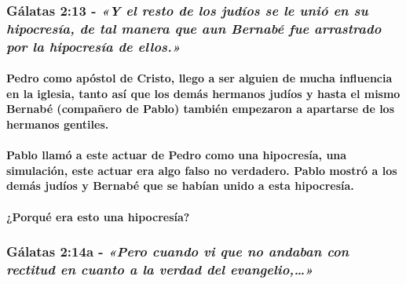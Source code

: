 \documentclass[11a pt,twoside]{article}
\newcommand{\scripture}[1]{%
  {\fontsize{12pt}{16pt}\selectfont\ScriptureFont\itshape #1}%
}
\let\oldsubsubsection\subsubsection
\renewcommand{\subsubsection}{\needspace{4\baselineskip}\oldsubsubsection}
\let\oldparagraph\paragraph
\renewcommand{\paragraph}{\needspace{3\baselineskip}\oldparagraph}
\begin{document}
\subsubsection{\texorpdfstring{Gálatas 2:13 -
\scripture{«Y el resto de los judíos se le unió en su hipocresía, de tal manera que aun Bernabé fue arrastrado por la hipocresía de ellos.»}}{Gálatas 2:13 - }}\label{guxe1latas-213---y-el-resto-de-los-juduxedos-se-le-uniuxf3-en-su-hipocresuxeda-de-tal-manera-que-aun-bernabuxe9-fue-arrastrado-por-la-hipocresuxeda-de-ellos.}

\paragraph{Pedro como apóstol de Cristo, llego a ser alguien de mucha
influencia en la iglesia, tanto así que los demás hermanos judíos y
hasta el mismo Bernabé (compañero de Pablo) también empezaron a
apartarse de los hermanos
gentiles.}\label{pedro-como-apuxf3stol-de-cristo-llego-a-ser-alguien-de-mucha-influencia-en-la-iglesia-tanto-asuxed-que-los-demuxe1s-hermanos-juduxedos-y-hasta-el-mismo-bernabuxe9-compauxf1ero-de-pablo-tambiuxe9n-empezaron-a-apartarse-de-los-hermanos-gentiles.}

\paragraph{Pablo llamó a este actuar de Pedro como una hipocresía, una
simulación, este actuar era algo falso no verdadero. Pablo mostró a los
demás judíos y Bernabé que se habían unido a esta
hipocresía.}\label{pablo-llamuxf3-a-este-actuar-de-pedro-como-una-hipocresuxeda-una-simulaciuxf3n-este-actuar-era-algo-falso-no-verdadero.-pablo-mostruxf3-a-los-demuxe1s-juduxedos-y-bernabuxe9-que-se-habuxedan-unido-a-esta-hipocresuxeda.}

\paragraph{¿Porqué era esto una
hipocresía?}\label{porquuxe9-era-esto-una-hipocresuxeda}

\subsubsection{\texorpdfstring{Gálatas 2:14a -
\scripture{«Pero cuando vi que no andaban con rectitud en cuanto a la verdad del evangelio,…»}}{Gálatas 2:14a - }}\label{guxe1latas-214a---pero-cuando-vi-que-no-andaban-con-rectitud-en-cuanto-a-la-verdad-del-evangelio}
\end{document}
